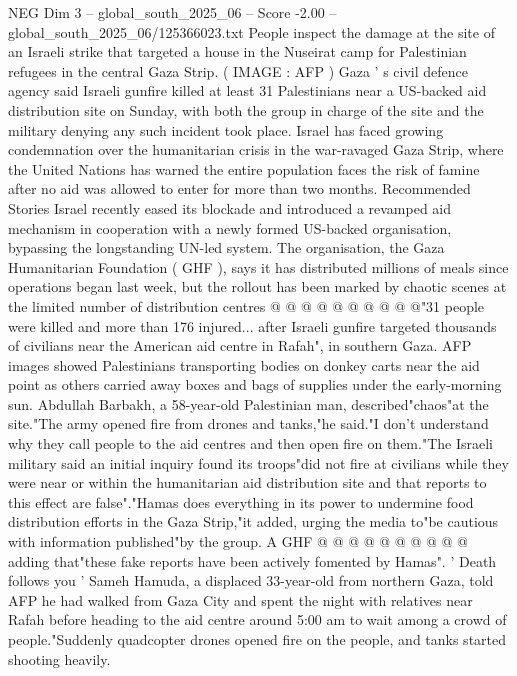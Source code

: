 \begin{textsample}{NEG Dim 3 – global\_south\_2025\_06 – Score -2.00 – global\_south\_2025\_06/125366023.txt}  \label{ex:f3_neg_261}
People inspect the damage at the site of an Israeli strike that targeted a house in the Nuseirat camp for Palestinian refugees in the central Gaza Strip. ( IMAGE : AFP ) Gaza ' s civil defence agency said Israeli gunfire killed at least 31 Palestinians near a US-backed aid distribution site on Sunday, with both the group in charge of the site and the military denying any such incident took place.
Israel has faced growing condemnation over the humanitarian crisis in the war-ravaged Gaza Strip, where the United Nations has warned the entire population faces the risk of famine after no aid was allowed to enter for more than two months.
Recommended Stories Israel recently eased its blockade and introduced a revamped aid mechanism in cooperation with a newly formed US-backed organisation, bypassing the longstanding UN-led system.
The organisation, the Gaza Humanitarian Foundation ( GHF ), says it has distributed millions of meals since operations began last week, but the rollout has been marked by chaotic scenes at the limited number of distribution centres @ @ @ @ @ @ @ @ @ @"31 people were killed and more than 176 injured... after Israeli gunfire targeted thousands of civilians near the American aid centre in Rafah", in southern Gaza.
AFP images showed Palestinians transporting bodies on donkey carts near the aid point as others carried away boxes and bags of supplies under the early-morning sun.
Abdullah Barbakh, a 58-year-old Palestinian man, described"chaos"at the site."The army opened fire from drones and tanks,"he said."I don't understand why they call people to the aid centres and then open fire on them."The Israeli military said an initial inquiry found its troops"did not fire at civilians while they were near or within the humanitarian aid distribution site and that reports to this effect are false"."Hamas does everything in its power to undermine food distribution efforts in the Gaza Strip,"it added, urging the media to"be cautious with information published"by the group.
A GHF @ @ @ @ @ @ @ @ @ @ adding that"these fake reports have been actively fomented by Hamas". ' Death follows you ' Sameh Hamuda, a displaced 33-year-old from northern Gaza, told AFP he had walked from Gaza City and spent the night with relatives near Rafah before heading to the aid centre around 5:00 am to wait among a crowd of people."Suddenly quadcopter drones opened fire on the people, and tanks started shooting heavily.

\end{textsample}
